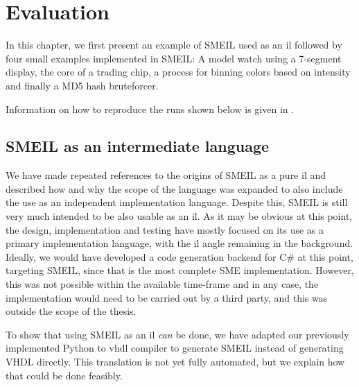 \chapter{Evaluation}
\label{eval}

In this chapter, we first present an example of SMEIL used as an \gls{il}
followed by four small examples implemented in SMEIL: A model watch using a
7-segment display, the core of a trading chip, a process for binning colors
based on intensity and finally a MD5 hash bruteforcer.  

Information on how to reproduce the runs shown below is given in .


\section{SMEIL as an intermediate language}
\label{sec:smeilil}
We have made repeated references to the origins of SMEIL as a pure \gls{il} and
described how and why the scope of the language was expanded to also include the
use as an independent implementation language. Despite this, SMEIL is still very
much intended to be also usable as an \gls{il}. As it may be obvious at this
point, the design, implementation and testing have mostly focused on its use as
a primary implementation language, with the \gls{il} angle remaining in the
background. Ideally, we would have developed a code generation backend for C\#
at this point, targeting SMEIL, since that is the most complete SME
implementation. %
However, this was not possible within the available time-frame
and in any case, the implementation would need to be carried out by a third
party, and this was outside the scope of the thesis.

To show that using SMEIL as an \gls{il} {\itshape can} be done, we have adapted
our previously implemented Python to \gls{vhdl} compiler to generate SMEIL
instead of generating VHDL directly. This translation is not yet fully
automated, but we explain how that could be done feasibly.

